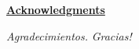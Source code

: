 \newpage

\centerline{\underline{\textbf{\Huge Acknowledgments}}}
\textit{Agradecimientos.}
\newline
\newline
\newline
\newline
\textit{Gracias!}
\newpage